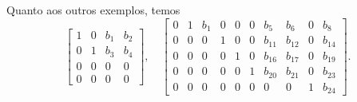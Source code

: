 \documentclass[../livro.tex]{subfiles} %
\begin{document}
Quanto aos outros exemplos, temos
\begin{equation}
\left[
\begin{array}{cccc}
1 & 0 & b_1 & b_2 \\
0 & 1 & b_3 & b_4 \\
0 & 0 & 0 & 0 \\
0 & 0 & 0 & 0
\end{array}
\right], \quad
\left[
\begin{array}{cccccccccc}
0 & 1 & b_1 & 0 & 0 & 0 & b_5 & b_6 & 0 & b_8 \\
0 & 0 & 0 & 1 & 0 &0 & b_{11} & b_{12} & 0 & b_{14} \\
0 & 0 & 0 & 0 & 1 & 0 & b_{16} & b_{17} & 0 & b_{19} \\
0 & 0 & 0 & 0 & 0 & 1 & b_{20} & b_{21} & 0 & b_{23} \\
0 & 0 & 0 & 0 & 0 & 0 & 0 & 0 & 1 & b_{24}
\end{array}
\right].
\end{equation}
\end{document}
